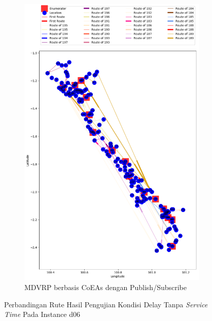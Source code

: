 \begin{figure}[H]\ContinuedFloat
	\centering
	\begin{subfigure}[t]{\textwidth}
		\centering
		\includegraphics[width=\textwidth]{Resources/Images/delayed_6/real_m15_n100_delayed_6_pubsub_coes}
		\caption{MDVRP berbasis CoEAs dengan Publish/Subscribe}
		\label{fig:real_m15_n100_delayed_6_pubsub_coes}
	\end{subfigure}
	\caption{Perbandingan Rute Hasil Pengujian Kondisi Delay Tanpa \textit{Service Time} Pada Instance d06}
	\label{fig:real_m15_n100_delayed_6_contd}
\end{figure}


